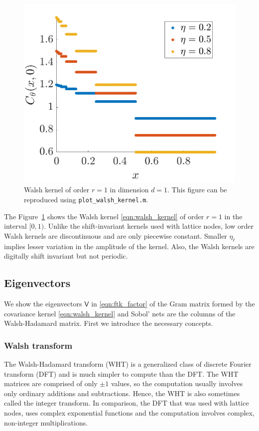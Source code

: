 \documentclass[graybox,footinfo]{svmult}
\newcommand{\mV}{\mathsf{V}}
\newcommand{\code}[1]{\texttt{#1}}
\newcommand\figref{Figure~\ref}
\newcommand{\JRNote}[1]{{\textcolor{green}{JR: #1}}}
\begin{document}
\begin{figure}
	\centering
	\includegraphics[width=0.9\linewidth]{"figures/walsh_kernel dim_1"}
	\caption[Walsh kernel]{Walsh kernel of order $r=1$ in dimension $d=1$. This figure can be reproduced using \code{plot\_walsh\_kernel.m}. %
	}
	\label{fig:walshkernel-dim1}
\end{figure}

The \figref{fig:walshkernel-dim1} shows the Walsh kernel \eqref{eqn:walsh_kernel} of order $r=1$ in the interval $[0,1)$. Unlike the shift-invariant kernels used with lattice nodes, low order Walsh kernels are discontinuous and are only piecewise constant. Smaller $\eta_\ell$ implies lesser variation in the amplitude of the kernel. Also, the Walsh kernels are digitally shift invariant but not periodic.

\subsection{Eigenvectors}

We show the eigenvectors $\mV$ in \eqref{eqn:ftk_factor} of the Gram matrix formed by the covariance kernel \eqref{eqn:walsh_kernel} and Sobol' nets are the columns of the Walsh-Hadamard matrix. First we introduce the necessary concepts.

\subsubsection{Walsh transform}
The Walsh-Hadamard transform (WHT) is a generalized class of discrete Fourier transform (DFT) and is much simpler to compute than the DFT. The WHT matrices are comprised of only $\pm 1$ values, so the computation usually involves only ordinary additions and subtractions. Hence, the WHT is also sometimes called the integer transform. In comparison, the DFT that was used with lattice nodes,  uses complex exponential functions and the computation involves complex, non-integer multiplications. 
\end{document}
